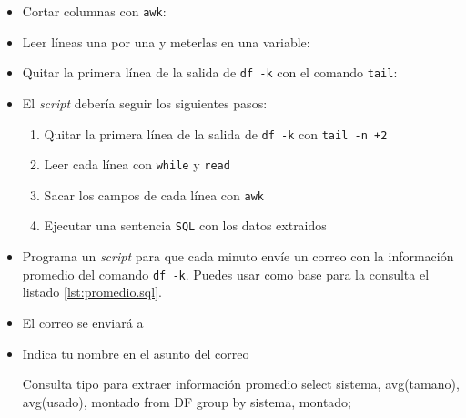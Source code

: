 \begin{homeworkProblem}
\begin{itemize}
  \item Cortar columnas con \texttt{awk}: 
    
  \item Leer líneas una por una y meterlas en una variable: 
    
  \item Quitar la primera línea de la salida de \texttt{df -k} con el comando \texttt{tail}: 
    
  \item El \textit{script} debería seguir los siguientes pasos:
    \begin{enumerate}
    \item Quitar la primera línea de la salida de \texttt{df -k} con \texttt{tail -n +2}
      
    \item Leer cada línea con \texttt{while} y \texttt{read}
    \item Sacar los campos de cada línea con \texttt{awk}
      
    \item Ejecutar una sentencia \texttt{SQL} con los datos extraidos
    \end{enumerate}
  \end{itemize}

  
  
\end{homeworkProblem}


\begin{homeworkProblem}

  \begin{itemize}
  \item Programa un \textit{script} para que cada minuto envíe un correo con la información promedio del comando  \texttt{df -k}. Puedes usar como base para la consulta el listado \ref{lst:promedio.sql}.
  \item El correo se enviará a 
  \item Indica tu nombre en el asunto del correo  


\begin{listadoshell}{Consulta tipo para extraer información promedio}
  select 
    sistema, avg(tamano), avg(usado), montado
  from 
    DF
  group by
    sistema, montado;
\end{listadoshell}
    
\end{itemize}
\end{homeworkProblem}


